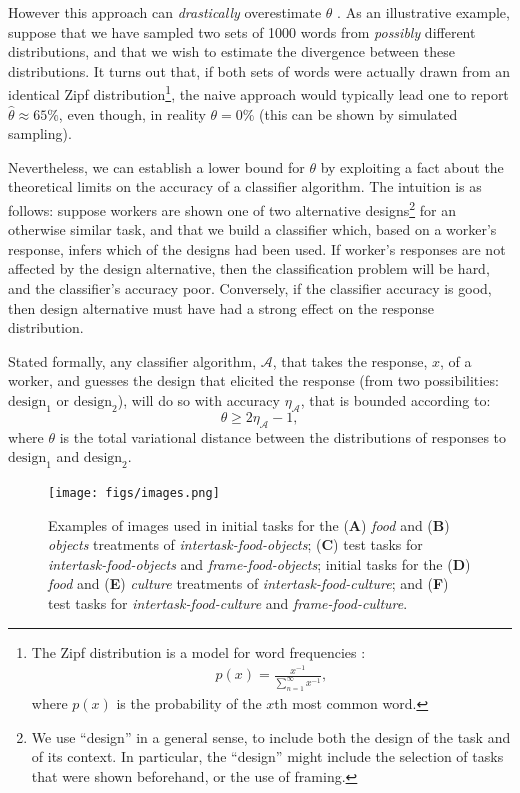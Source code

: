 \documentclass{sigchi}
\begin{document}
However this approach can \textit{drastically} overestimate $\theta$
\cite{val-thesis}.  As an illustrative example,
suppose that we have sampled two sets of 1000 words from \textit{possibly} 
different distributions, and that we wish to estimate the divergence 
between these distributions.  
It turns out that, if both sets of words were actually drawn from 
an identical Zipf distribution\footnote{The 
  Zipf distribution is a model for word frequencies 
  \cite{powers1998applications,zipf1949human}:
  \begin{align}
	p(x) = \frac{x^{-1}}{\sum_{n=1}^{\infty}x^{-1}},
	\label{eq:zipf}
  \end{align}
  where $p(x)$ is the probability of the $x$th most common word.
}, the naive approach would typically lead one to report 
$\hat{\theta} \approx 65\%$, even though, in reality $\theta = 0\%$
(this can be shown by simulated sampling).

Nevertheless, we can establish a lower bound for $\theta$ by 
exploiting a fact about the theoretical limits on the accuracy of a 
classifier algorithm.  The intuition is as follows: 
suppose workers are shown one of two alternative designs\footnote{We
use ``design'' in a general sense, to include both the design of the task
and of its context.  In particular, the ``design'' might include the
selection of tasks that were shown beforehand, or the use of framing.}
for an otherwise
similar task, and that we build a classifier which, 
based on a worker's response, infers which of the designs had been 
used.
If worker's responses are not affected by the design alternative,
then the classification problem will be hard, and the classifier's 
accuracy poor.
Conversely, if the classifier accuracy is good, then design alternative 
must have had a strong effect on the response distribution.

Stated formally, any classifier algorithm, $\mathcal{A}$, that
takes the response, $x$, of a worker, and guesses the 
design that elicited the response (from two possibilities:
$\mathrm{design}_1$ or $\mathrm{design}_2$), will do so with accuracy 
$\eta_\mathcal{A}$, that is bounded according to:
\begin{equation}
	\theta \geq 2\eta_\mathcal{A} - 1,
	\label{eq:sup:l1}
\end{equation}
where $\theta$ is the total variational distance between the 
distributions of responses
to $\mathrm{design}_1$ and $\mathrm{design}_2$.

\begin{figure}
	\centering
	\texttt{[image: figs/images.png]}
	\caption{
		Examples of images used in
		initial tasks for the (\textbf{A}) \textit{food} and (\textbf{B}) 
		\textit{objects} treatments of \textit{intertask-food-objects};
		(\textbf{C}) test tasks for \textit{intertask-food-objects} and 
		\textit{frame-food-objects};
		initial tasks for the (\textbf{D}) \textit{food} and (\textbf{E}) 
		\textit{culture} treatments of \textit{intertask-food-culture};
		and (\textbf{F}) test tasks for \textit{intertask-food-culture} and 
		\textit{frame-food-culture}.
	}

	\label{fig:task}
\end{figure}
\end{document}
